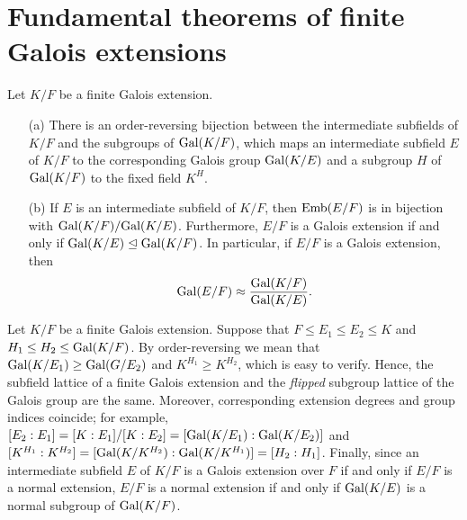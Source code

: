 \section{Fundamental theorems of finite Galois extensions}

\begin{thm}\label{Galois's_thm_1}
    Let $K/F$ be a finite Galois extension.
    \begin{enumerate}
        \item[(a)]
        {
            There is an order-reversing bijection between the intermediate subfields of $K/F$ and the subgroups of ${\textrm{Gal}({K/F})}$, which maps an intermediate subfield $E$ of $K/F$ to the corresponding Galois group ${\textrm{Gal}({K/E})}$ and a subgroup $H$ of ${\textrm{Gal}({K/F})}$ to the fixed field $K^H$.
        }
        \item[(b)]
        {
            If $E$ is an intermediate subfield of $K/F$, then ${\textrm{Emb}({E/F})}$ is in bijection with ${\textrm{Gal}({K/F})}/{\textrm{Gal}({K/E})}$.
            Furthermore, $E/F$ is a Galois extension if and only if ${\textrm{Gal}({K/E})}\trianglelefteq{\textrm{Gal}({K/F})}$.
            In particular, if $E/F$ is a Galois extension, then
            \begin{align*}
                {\textrm{Gal}({E/F})}\approx\frac{{\textrm{Gal}({K/F})}}{{\textrm{Gal}({K/E})}}.
            \end{align*}
        }
    \end{enumerate}
\end{thm}
\begin{rmk}
    Let $K/F$ be a finite Galois extension.
    Suppose that $F\leq E_1\leq E_2\leq K$ and $H_1\leq H_2\leq {\textrm{Gal}({K/F})}$.
    By order-reversing we mean that ${\textrm{Gal}({K/E_1})}\geq{\textrm{Gal}({G/E_2})}$ and $K^{H_1}\geq K^{H_2}$, which is easy to verify.
    Hence, the subfield lattice of a finite Galois extension and the \textit{flipped} subgroup lattice of the Galois group are the same.
    Moreover, corresponding extension degrees and group indices coincide; for example, $[E_2: E_1]=[K:E_1]/[K:E_2]=[{\textrm{Gal}({K/E_1})}: {\textrm{Gal}({K/E_2})}]$ and $[K^{H_1}: K^{H_2}]=[{\textrm{Gal}({K/K^{H_2}})}: {\textrm{Gal}({K/K^{H_1}})}]=[H_2: H_1]$.
    Finally, since an intermediate subfield $E$ of $K/F$ is a Galois extension over $F$ if and only if $E/F$ is a normal extension, $E/F$ is a normal extension if and only if ${\textrm{Gal}({K/E})}$ is a normal subgroup of ${\textrm{Gal}({K/F})}$.
\end{rmk}

